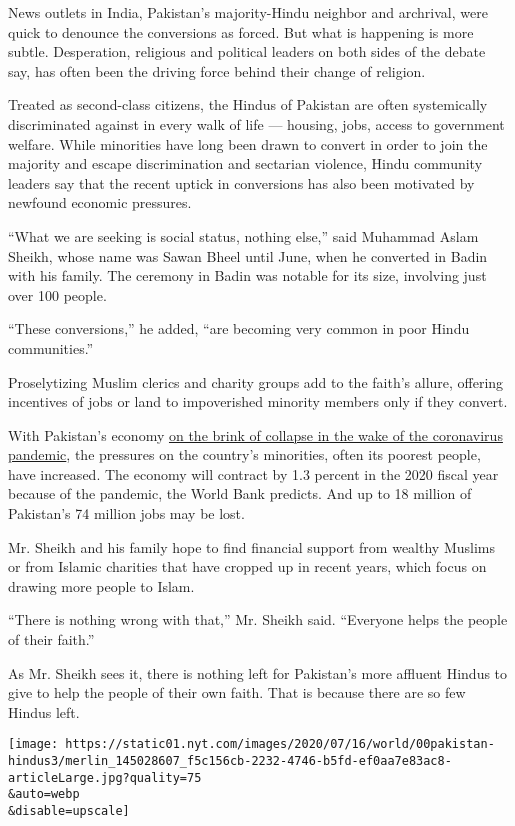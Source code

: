 News outlets in India, Pakistan's majority-Hindu neighbor and archrival,
were quick to denounce the conversions as forced. But what is happening
is more subtle. Desperation, religious and political leaders on both
sides of the debate say, has often been the driving force behind their
change of religion.

Treated as second-class citizens, the Hindus of Pakistan are often
systemically discriminated against in every walk of life --- housing,
jobs, access to government welfare. While minorities have long been
drawn to convert in order to join the majority and escape discrimination
and sectarian violence, Hindu community leaders say that the recent
uptick in conversions has also been motivated by newfound economic
pressures.

``What we are seeking is social status, nothing else,'' said Muhammad
Aslam Sheikh, whose name was Sawan Bheel until June, when he converted
in Badin with his family. The ceremony in Badin was notable for its
size, involving just over 100 people.

``These conversions,'' he added, ``are becoming very common in poor
Hindu communities.''

Proselytizing Muslim clerics and charity groups add to the faith's
allure, offering incentives of jobs or land to impoverished minority
members only if they convert.

With Pakistan's economy
\href{https://www.nytimes.com/2020/06/15/world/asia/pakistan-coronavirus-hospitals.html}{on
the brink of collapse in the wake of the coronavirus pandemic}, the
pressures on the country's minorities, often its poorest people, have
increased. The economy will contract by 1.3 percent in the 2020 fiscal
year because of the pandemic, the World Bank predicts. And up to 18
million of Pakistan's 74 million jobs may be lost.

Mr. Sheikh and his family hope to find financial support from wealthy
Muslims or from Islamic charities that have cropped up in recent years,
which focus on drawing more people to Islam.

``There is nothing wrong with that,'' Mr. Sheikh said. ``Everyone helps
the people of their faith.''

As Mr. Sheikh sees it, there is nothing left for Pakistan's more
affluent Hindus to give to help the people of their own faith. That is
because there are so few Hindus left.

\texttt{[image: https://static01.nyt.com/images/2020/07/16/world/00pakistan-hindus3/merlin\_145028607\_f5c156cb-2232-4746-b5fd-ef0aa7e83ac8-articleLarge.jpg?quality=75\\\&auto=webp\\\&disable=upscale]}

